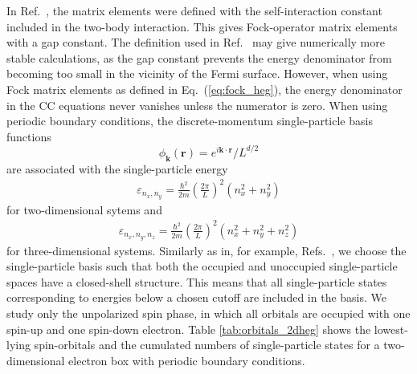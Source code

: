 \documentclass[aps,twocolumn,showpacs,floatfix,nofootinbib,preprintnumbers,superscriptaddress,amsmath,amssymb]{revtex4-1}
\begin{document}
In Ref.~\cite{shepherd2013b}, the matrix elements were 
defined with the self-interaction constant included in the
two-body interaction. This gives Fock-operator matrix 
elements with a gap constant. The definition used in 
Ref.~\cite{shepherd2013b} may give numerically more
stable calculations, as the gap constant 
prevents the energy denominator from becoming too small
in the vicinity of the Fermi surface. However, when using
Fock matrix elements as defined in Eq.~(\ref{eq:fock_heg}), 
the energy denominator in the CC equations never vanishes 
unless the numerator is zero. 
When using periodic boundary conditions, the 
discrete-momentum single-particle basis functions 
\[
\phi_{\mathbf{k}}(\mathbf{r}) =
e^{i\mathbf{k}\cdot \mathbf{r}}/L^{d/2}
\]
are associated with 
the single-particle energy   
\begin{align}
  \varepsilon_{n_{x}, n_{y}} = \frac{\hbar^{2}}{2m} 
  \left( \frac{2\pi }{L}\right)^{2}
  \left( n_{x}^{2} + n_{y}^{2}\right)
\end{align}
for two-dimensional sytems and 
\begin{align}
  \varepsilon_{n_{x}, n_{y}, n_{z}} = \frac{\hbar^{2}}{2m}
  \left( \frac{2\pi }{L}\right)^{2}
  \left( n_{x}^{2} + n_{y}^{2} + n_{z}^{2}\right)
\end{align} 
for three-dimensional systems. Similarly as in, for example, 
Refs.~\cite{shepherd2012a,roggero2013,hagen2014}, we choose 
the single-particle basis such that both the occupied and 
unoccupied single-particle spaces have a closed-shell 
structure. This means that all single-particle states 
corresponding to energies below a chosen cutoff are
included in the basis. We study only the unpolarized spin
phase, in which all orbitals are occupied with one spin-up 
and one spin-down electron. Table \ref{tab:orbitals_2dheg}
shows the lowest-lying spin-orbitals and the cumulated
numbers of single-particle states for a two-dimensional
electron box with periodic boundary conditions.
\end{document}
